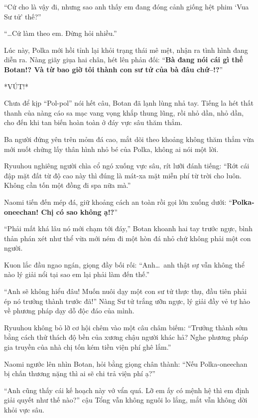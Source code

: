 \documentclass[../main.tex]{subfiles}
\begin{document}
``Cứ cho là vậy đi, nhưng sao anh thấy em đang đóng cảnh giống hệt phim `Vua Sư tử' thế?''

``\dots Cứ làm theo em. Đừng hỏi nhiều.''

Lúc này, Polka mới hồi tỉnh lại khỏi trạng thái mê mệt, nhận ra tình hình đang diễn ra. Nàng giãy giụa hai chân, hét lên phản đối: ``\textbf{Bà đang nói cái gì thế Botan!? Và từ bao giờ tôi thành con sư tử của bà đâu chứ--!?}''

*VÚT!*

Chưa để kịp ``Pol-pol'' nói hết câu, Botan đã lạnh lùng nhả tay. Tiếng la hét thất thanh của nàng cáo sa mạc vang vọng khắp thung lũng, rồi nhỏ dần, nhỏ dần, cho đến khi tan biến hoàn toàn ở đáy vực sâu thăm thẳm.


Ba người đứng yên trên mỏm đá cao, mắt dõi theo khoảng không thăm thẳm vừa mới nuốt chửng lấy thân hình nhỏ bé của Polka, không ai nói một lời.

Ryuuhou nghiêng người chìa cổ ngó xuống vực sâu, rít lưỡi đánh tiếng: ``Rớt cái đập mặt đất từ độ cao này thì đúng là mát-xa mặt miễn phí từ trời cho luôn. Không cần tốn một đồng đi spa nữa mà.''

Naomi tiến đến mép đá, giữ khoảng cách an toàn rồi gọi lớn xuống dưới: ``\textbf{Polka-oneechan! Chị có sao không ạ!?}''

``Phải mất khá lâu nó mới chạm tới đáy,'' Botan khoanh hai tay trước ngực, bình thản phán xét như thể vừa mới ném đi một hòn đá nhỏ chứ không phải một con người.

Kuon lắc đầu ngao ngán, giọng đầy bối rối: ``Anh\dots\ anh thật sự vẫn không thể nào lý giải nổi tại sao em lại phải làm đến thế.''

``Anh sẽ không hiểu đâu! Muốn nuôi dạy một con sư tử thực thụ, đầu tiên phải ép nó trưởng thành trước đã!'' Nàng Sư tử trắng ưỡn ngực, lý giải đầy vẻ tự hào về phương pháp dạy dỗ độc đáo của mình.

Ryuuhou không bỏ lỡ cơ hội chêm vào một câu châm biếm: ``Trưởng thành sớm bằng cách thử thách độ bền của xương chậu người khác hả? Nghe phương pháp gia truyền của nhà chị tốn kém tiền viện phí ghê lắm.''

Naomi ngước lên nhìn Botan, hỏi bằng giọng chân thành: ``Nếu Polka-oneechan bị chấn thương nặng thì ai sẽ chi trả viện phí ạ?''

``Anh cũng thấy cái kế hoạch này vớ vẩn quá. Lỡ em ấy có mệnh hệ thì em định giải quyết như thế nào?'' cậu Tổng vẫn không nguôi lo lắng, mắt vẫn không dời khỏi vực sâu.
\end{document}
